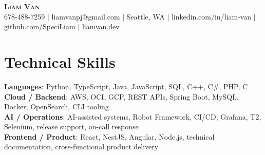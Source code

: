 \documentclass[letterpaper,11pt]{article}
\begin{document}

%
\begin{center}
    \textbf{\Huge \scshape Liam Van} \\ \vspace{1pt}
    \small 678-488-7259 $|$ \small {liamvanpj@gmail.com} $|$ Seattle, WA
 {{$|$ linkedin.com/in/liam-van} {$|$ github.com/SpeciLiam} {$|$ \href{https://liamvan.dev}{liamvan.dev}}}

\end{center}

\section{Technical Skills}
 \begin{itemize}[leftmargin=0.15in, label={}]
    \small{\item{
     \textbf{Languages}{: Python, TypeScript, Java, JavaScript, SQL, C++, C\#, PHP, C} \\
     \textbf{Cloud / Backend}{: AWS, OCI, GCP, REST APIs, Spring Boot, MySQL, Docker, OpenSearch, CLI tooling} \\
     \textbf{AI / Operations}{: AI-assisted systems, Robot Framework, CI/CD, Grafana, T2, Selenium, release support, on-call response} \\
     \textbf{Frontend / Product}{: React, NestJS, Angular, Node.js, technical documentation, cross-functional product delivery} \\
    }}
 \end{itemize}
%

\end{document}
